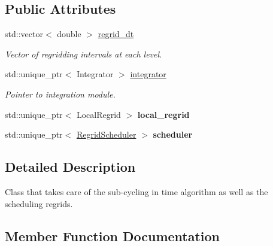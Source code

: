 \subsection*{Public Attributes}
\begin{DoxyCompactItemize}
\item 
\mbox{\label{classsledgehamr_1_1TimeStepper_a5bf9f74cdd6c280390417bf5c202b824}} 
std\+::vector$<$ double $>$ \mbox{\hyperlink{classsledgehamr_1_1TimeStepper_a5bf9f74cdd6c280390417bf5c202b824}{regrid\+\_\+dt}}
\begin{DoxyCompactList}\small\item\em Vector of regridding intervals at each level. \end{DoxyCompactList}\item 
\mbox{\label{classsledgehamr_1_1TimeStepper_ad6770cb1fe15aac86e1d3177871e3a59}} 
std\+::unique\+\_\+ptr$<$ Integrator $>$ \mbox{\hyperlink{classsledgehamr_1_1TimeStepper_ad6770cb1fe15aac86e1d3177871e3a59}{integrator}}
\begin{DoxyCompactList}\small\item\em Pointer to integration module. \end{DoxyCompactList}\item 
\mbox{\label{classsledgehamr_1_1TimeStepper_a72c737467fbb1dd826d088256708d652}} 
std\+::unique\+\_\+ptr$<$ Local\+Regrid $>$ {\bfseries local\+\_\+regrid}
\item 
\mbox{\label{classsledgehamr_1_1TimeStepper_aa8f91c75fad99d45941504c7694198a8}} 
std\+::unique\+\_\+ptr$<$ \mbox{\hyperlink{classsledgehamr_1_1RegridScheduler}{Regrid\+Scheduler}} $>$ {\bfseries scheduler}
\end{DoxyCompactItemize}


\subsection{Detailed Description}
Class that takes care of the sub-\/cycling in time algorithm as well as the scheduling regrids. 

\subsection{Member Function Documentation}
\mbox{\label{classsledgehamr_1_1TimeStepper_a029f92dcddadc58f020a528cd93da35d}} 
